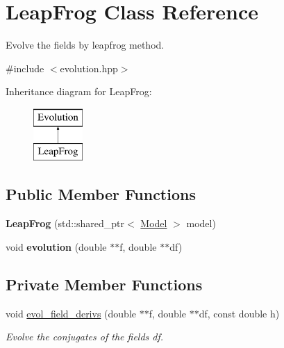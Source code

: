 \hypertarget{class_leap_frog}{}\section{Leap\+Frog Class Reference}
\label{class_leap_frog}


Evolve the fields by leapfrog method.  




{\ttfamily \#include $<$evolution.\+hpp$>$}

Inheritance diagram for Leap\+Frog\+:\begin{figure}[H]
\begin{center}
\leavevmode
\includegraphics[height=2.000000cm]{class_leap_frog}
\end{center}
\end{figure}
\subsection*{Public Member Functions}
\begin{DoxyCompactItemize}
\item 
\mbox{\label{class_leap_frog_a33b123fe88e71783cecdd1b9d0072c3f}} 
{\bfseries Leap\+Frog} (std\+::shared\+\_\+ptr$<$ \mbox{\hyperlink{class_model}{Model}} $>$ model)
\item 
\mbox{\label{class_leap_frog_a8a7b7814a7e1953c1c0a08ddfe3e49db}} 
void {\bfseries evolution} (double $\ast$$\ast$f, double $\ast$$\ast$df)
\end{DoxyCompactItemize}
\subsection*{Private Member Functions}
\begin{DoxyCompactItemize}
\item 
void \mbox{\hyperlink{class_leap_frog_a0798b7d6bfdf2f19e5bce08c4ce17d29}{evol\+\_\+field\+\_\+derivs}} (double $\ast$$\ast$f, double $\ast$$\ast$df, const double h)
\begin{DoxyCompactList}\small\item\em Evolve the conjugates of the fields df. \end{DoxyCompactList}\end{DoxyCompactItemize}
